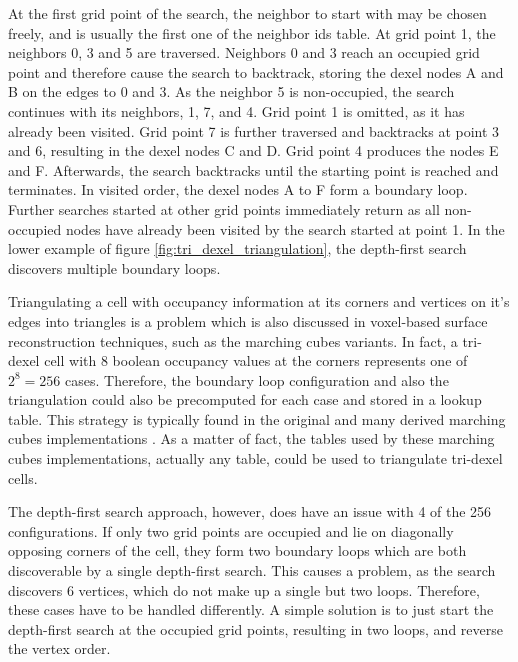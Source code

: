 At the first grid point of the search, the neighbor to start with may be chosen freely, and is usually the first one of the neighbor ids table.
At grid point 1, the neighbors 0, 3 and 5 are traversed.
Neighbors 0 and 3 reach an occupied grid point and therefore cause the search to backtrack, storing the dexel nodes A and B on the edges to 0 and 3.
As the neighbor 5 is non-occupied, the search continues with its neighbors, 1, 7, and 4.
Grid point 1 is omitted, as it has already been visited.
Grid point 7 is further traversed and backtracks at point 3 and 6, resulting in the dexel nodes C and D.
Grid point 4 produces the nodes E and F.
Afterwards, the search backtracks until the starting point is reached and terminates.
In visited order, the dexel nodes A to F form a boundary loop.
Further searches started at other grid points immediately return as all non-occupied nodes have already been visited by the search started at point 1.
%
In the lower example of figure \ref{fig:tri_dexel_triangulation}, the depth-first search discovers multiple boundary loops.

Triangulating a cell with occupancy information at its corners and vertices on it's edges into triangles is a problem which is also discussed in voxel-based surface reconstruction techniques, such as the marching cubes variants.
In fact, a tri-dexel cell with 8 boolean occupancy values at the corners represents one of $2^8 = 256$ cases.
Therefore, the boundary loop configuration and also the triangulation could also be precomputed for each case and stored in a lookup table.
This strategy is typically found in the original and many derived marching cubes implementations \cite{marching_cubes}.
As a matter of fact, the tables used by these marching cubes implementations, actually any table, could be used to triangulate tri-dexel cells.

The depth-first search approach, however, does have an issue with 4 of the 256 configurations.
If only two grid points are occupied and lie on diagonally opposing corners of the cell, they form two boundary loops which are both discoverable by a single depth-first search.
This causes a problem, as the search discovers 6 vertices, which do not make up a single but two loops.
Therefore, these cases have to be handled differently.
A simple solution is to just start the depth-first search at the occupied grid points, resulting in two loops, and reverse the vertex order.

